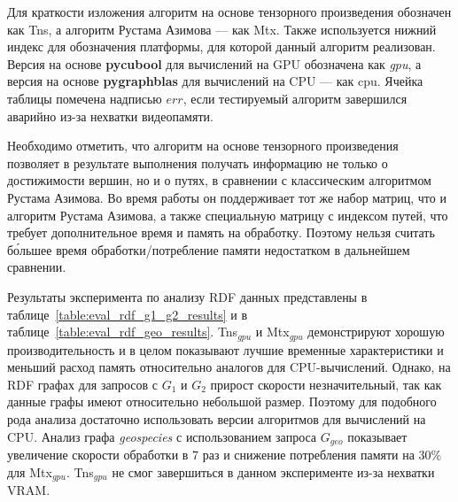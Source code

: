 Для краткости изложения алгоритм на основе тензорного произведения обозначен как Tns, а алгоритм Рустама Азимова --- как Mtx.
Также используется нижний индекс для обозначения платформы, для которой данный алгоритм реализован.
Версия на основе \textbf{pycubool} для вычислений на GPU обозначена как \textit{gpu}, а версия на основе \textbf{pygraphblas} для вычислений на CPU  --- как \textit{}{cpu}. Ячейка таблицы помечена надписью $err$, если тестируемый алгоритм завершился аварийно из-за нехватки видеопамяти. 

Необходимо отметить, что алгоритм на основе тензорного произведения позволяет в результате выполнения получать информацию не только о достижимости вершин, но и о путях, в сравнении с классическим алгоритмом Рустама Азимова.
Во время работы он поддерживает тот же набор матриц, что и алгоритм Рустама Азимова, а также специальную матрицу с индексом путей, что требует дополнительное время и память на обработку. 
Поэтому нельзя считать б\'ольшее время обработки/потребление памяти недостатком в дальнейшем сравнении.

Результаты эксперимента по анализу RDF данных представлены в таблице~\ref{table:eval_rdf_g1_g2_results} и в таблице~\ref{table:eval_rdf_geo_results}. 
Tns$_{gpu}$ и Mtx$_{gpu}$ демонстрируют хорошую производительность и в целом показывают лучшие временные характеристики и меньший расход память относительно аналогов для CPU-вычислений. 
Однако, на RDF графах для запросов с $G_1$ и $G_2$ прирост скорости незначительный, 
так как данные графы имеют относительно небольшой размер.
Поэтому для подобного рода анализа достаточно использовать версии алгоритмов для вычислений на CPU. 
Анализ графа \textit{geospecies} с использованием запроса $G_{geo}$ показывает увеличение скорости обработки в 7 раз и снижение потребления памяти на 30\% для Mtx$_{gpu}$. 
Tns$_{gpu}$ не смог завершиться в данном эксперименте из-за нехватки VRAM.


